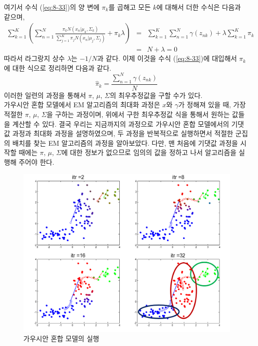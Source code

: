\documentclass[a4paper]{oblivoir}
\begin{document}
여기서 수식 (\ref{eq:8-33})의 양 변에 $\pi_{k}$를 곱해고 모든 $k$에 대해서 더한 수식은 다음과 같으며,
\begin{eqnarray}
\sum_{k=1}^{K} (\sum_{n=1}^{N} \frac{ \pi_{k} N(x_{n}|{\mu}_{k}, {\Sigma}_{k}) }{ \sum_{j=1}^{K} \pi_{j} N(x_{n}|{\mu}_{j}, {\Sigma}_{j}) } + \pi_{k} \lambda) & = & \sum_{k=1}^{K} \sum_{n=1}^{N}  \gamma(z_{nk}) + \lambda \sum_{k=1}^{K} \pi_{k}    \nonumber  \\
& = & N + \lambda = 0 \label{eq:8-34} 
\end{eqnarray}
따라서 라그랑지 상수 $\lambda$는 $-1/N$과 같다. 이제 이것을 수식 (\ref{eq:8-33})에 대입해서 ${\pi}_{k}$에 대한 식으로 정리하면 다음과 같다. 
\begin{equation}
\hat{\pi}_{k} = \frac{\sum_{n=1}^{N} \gamma(z_{nk})}{N} \label{eq:8-36} 
\end{equation}
이러한 일련의 과정을 통해서 $\pi$, ${\mu}$, ${\Sigma}$의 최우추정값을 구할 수가 있다. \\ 

가우시안 혼합 모델에서 EM 알고리즘의 최대화 과정은 $x$와 $\gamma$가 정해져 있을 때, 가장 적절한 $\pi$, ${\mu}$, ${\Sigma}$을 구하는 과정이며, 위에서 구한 최우추정값 식을 통해서 원하는 값들을 계산할 수 있다. 결국 우리는 지금까지의 과정으로 가우시안 혼합 모델에서의 기댓값 과정과 최대화 과정을 설명하였으며, 두 과정을 반복적으로 실행하면서 적절한 군집의 배치를 찾는 EM 알고리즘의 과정을 알아보았다. 다만, 맨 처음에 기댓값 과정을 시작할 때에는 $\pi$, ${\mu}$, ${\Sigma}$에 대한 정보가 없으므로 임의의 값을 정하고 나서 알고리즘을 실행해 주어야 한다. 

\begin{figure}[ht] \centering 
\includegraphics[scale=0.7]{fig8_11.png} 
\caption{가우시안 혼합 모델의 실행}
\label{fig:8-11}
\end{figure} 
\end{document}
